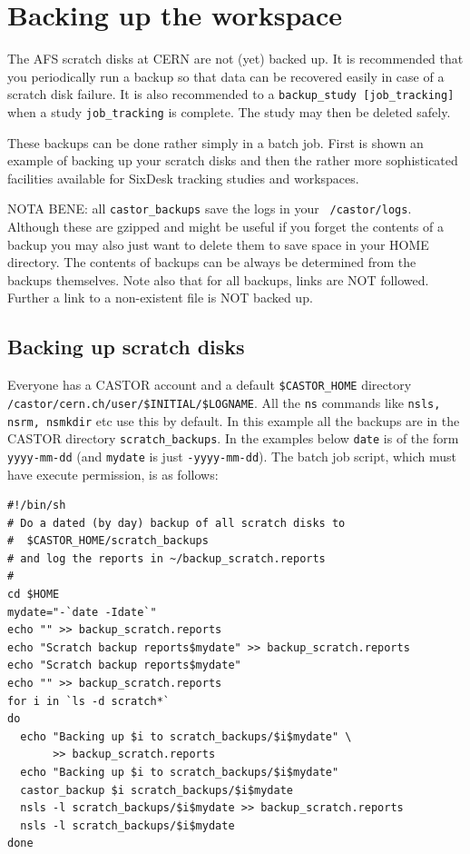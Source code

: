 \documentclass{cernatsnote}    %
\begin{document}
\section{Backing up the workspace}
\label{sec:backup}
The AFS scratch disks at CERN are not (yet) backed up.
It is recommended that you periodically run a backup so that data can be recovered 
easily in case of a scratch disk failure. It is also recommended to a
{\tt backup\_study [job\_tracking]} when a study {\tt job\_tracking} is complete.
The study may then be deleted safely.

 These backups can be done rather simply in a batch job. First is shown an example of 
backing up your scratch disks and then the rather more sophisticated
facilities available for SixDesk tracking studies and workspaces.

NOTA BENE: all {\tt castor\_backups} save the logs in your {\tt ~/castor/logs}. Although
these are gzipped and might be useful if you forget the contents of a backup
you may also just want to delete them to save space in your HOME directory.
The contents of backups can be always be determined from the backups
themselves. Note also that for all backups, links are NOT followed. Further
a link to a non-existent file is NOT backed up.

 \subsection{Backing up scratch disks}
 Everyone has a CASTOR account and a default {\tt \$CASTOR\_HOME} directory
{\tt /castor/cern.ch/user/\$INITIAL/\$LOGNAME}. All the {\tt ns} commands like
{\tt nsls, nsrm, nsmkdir} etc use this by default. In this example
all the backups are in the CASTOR directory {\tt scratch\_backups}. 
In the examples below {\tt date} is of the form {\tt yyyy-mm-dd} 
(and {\tt mydate} is just {\tt -yyyy-mm-dd}).
The batch job script, which must have execute permission, is as follows:
\begin{verbatim}
#!/bin/sh
# Do a dated (by day) backup of all scratch disks to 
#  $CASTOR_HOME/scratch_backups
# and log the reports in ~/backup_scratch.reports
#
cd $HOME
mydate="-`date -Idate`"
echo "" >> backup_scratch.reports
echo "Scratch backup reports$mydate" >> backup_scratch.reports
echo "Scratch backup reports$mydate"
echo "" >> backup_scratch.reports
for i in `ls -d scratch*`
do
  echo "Backing up $i to scratch_backups/$i$mydate" \
       >> backup_scratch.reports
  echo "Backing up $i to scratch_backups/$i$mydate"
  castor_backup $i scratch_backups/$i$mydate
  nsls -l scratch_backups/$i$mydate >> backup_scratch.reports
  nsls -l scratch_backups/$i$mydate
done
\end{verbatim}
\end{document}
